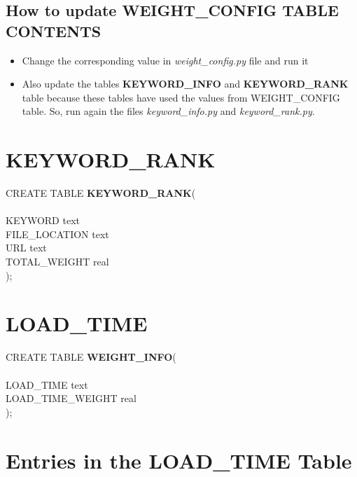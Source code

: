 \documentclass{scrreprt}
\begin{document}
\subsection{How to update WEIGHT_CONFIG TABLE CONTENTS}
    \begin{itemize}
      \item Change the corresponding value in \textit{weight_config.py} file and run it
      \item Also update the tables \textbf{KEYWORD_INFO} and \textbf{KEYWORD_RANK} table because these tables have used the values from WEIGHT_CONFIG table. So, run again the files \textit{keyword_info.py} and \textit{keyword_rank.py}.
    
    
    \end{itemize}


\section{KEYWORD_RANK}

CREATE TABLE  \hspace{15pt}  \textbf{KEYWORD_RANK}(\\ \\
    KEYWORD		 \hspace{15pt} 	text\\
    FILE_LOCATION \hspace{15pt} 			text\\
    URL 		 \hspace{15pt} 		text\\
    TOTAL_WEIGHT \hspace{15pt} 			real\\
);

\section{LOAD_TIME}
    CREATE TABLE  \textbf{WEIGHT_INFO}(\\ \\
    LOAD_TIME  	 \hspace{15pt}  	text\\
    LOAD_TIME_WEIGHT 	   \hspace{15pt}        		real\\
);\\






\section{Entries in the LOAD_TIME Table}
\end{document}
